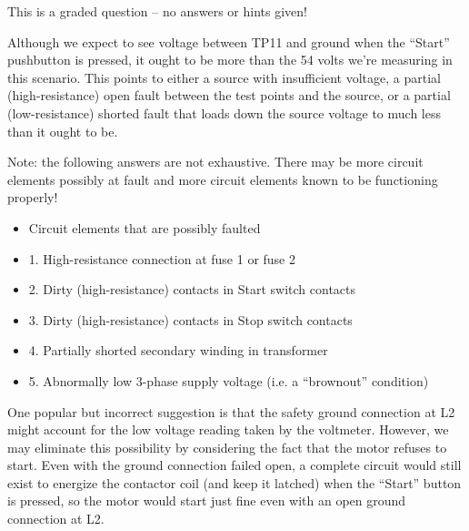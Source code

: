 
This is a graded question -- no answers or hints given!







Although we expect to see voltage between TP11 and ground when the ``Start'' pushbutton is pressed, it ought to be more than the 54 volts we're measuring in this scenario.  This points to either a source with insufficient voltage, a partial (high-resistance) open fault between the test points and the source, or a partial (low-resistance) shorted fault that loads down the source voltage to much less than it ought to be.

\vskip 10pt

Note: the following answers are not exhaustive.  There may be more circuit elements possibly at fault and more circuit elements known to be functioning properly!

\begin{itemize}
\item{} Circuit elements that are possibly faulted
\item{1.} High-resistance connection at fuse 1 or fuse 2
\item{2.} Dirty (high-resistance) contacts in Start switch contacts
\item{3.} Dirty (high-resistance) contacts in Stop switch contacts
\item{4.} Partially shorted secondary winding in transformer
\item{5.} Abnormally low 3-phase supply voltage (i.e. a ``brownout'' condition)
\end{itemize}

\vskip 10pt

One popular but incorrect suggestion is that the safety ground connection at L2 might account for the low voltage reading taken by the voltmeter.  However, we may eliminate this possibility by considering the fact that the motor refuses to start.  Even with the ground connection failed open, a complete circuit would still exist to energize the contactor coil (and keep it latched) when the ``Start'' button is pressed, so the motor would start just fine even with an open ground connection at L2.




